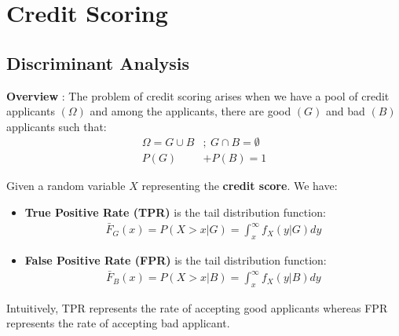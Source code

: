 \newpage
\section{Credit Scoring}

\subsection{Discriminant Analysis}
\textbf{Overview} : The problem of credit scoring arises when we have a pool of credit applicants $(\Omega)$ and among the applicants, there are good $(G)$ and bad $(B)$ applicants such that:
\begin{align*}
    \Omega = G \cup B &; \ G \cap B = \emptyset \\
    P(G) &+ P(B) = 1
\end{align*}

\begin{definition}
    Given a random variable $X$ representing the \textbf{credit score}. We have:
    \begin{itemize}
        \item \textbf{True Positive Rate (TPR)} is the tail distribution function:
        \begin{align*}
            \bar F_G(x) = P(X > x|G) = \int_x^\infty f_X(y|G)dy
        \end{align*}

        \item \textbf{False Positive Rate (FPR)} is the tail distribution function:
        \begin{align*}
            \bar F_B(x) = P(X > x|B) = \int_x^\infty f_X(y|B)dy
        \end{align*}
    \end{itemize}

    \noindent Intuitively, TPR represents the rate of accepting good applicants whereas FPR represents the rate of accepting bad applicant.
\end{definition}

